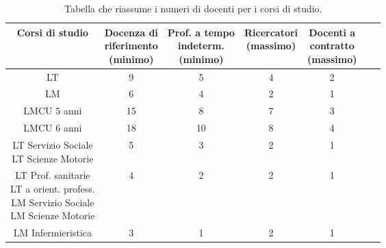\begin{table}[h!]
    \centering
    \renewcommand{\arraystretch}{1.8}
    \begin{tabular}{|c|c|c|c|c|c|c|}
    \hline
    Corsi di studio & \makecell{Docenza di \\riferimento \\(\textbf{minimo})} & \makecell{Prof. a tempo\\indeterm.\\(\textbf{minimo})} & \makecell{Ricercatori\\(\textbf{massimo})} & \makecell{Docenti a\\contratto\\(\textbf{massimo})} \\
    \hline
    LT & 9 & 5 & 4 & 2 \\
    \hline 
    LM & 6 & 4 & 2 & 1 \\
    \hline
    LMCU 5 anni & 15 & 8 & 7 & 3 \\
    \hline
    LMCU 6 anni & 18 & 10 & 8 & 4 \\
    \hline
    \makecell{LT Servizio Sociale\\LT Scienze Motorie} & 5 & 3 & 2 & 1 \\
    \hline
    \makecell{LT Prof. sanitarie\\LT a orient. profess.\\LM Servizio Sociale\\LM Scienze Motorie} & 4 & 2 & 2 & 1 \\
    \hline
    LM Infermieristica & 3 & 1 & 2 & 1 \\
    \hline
    \end{tabular}
    \caption{Tabella che riassume i numeri di docenti per i corsi di studio.}
    \label{tab:casi-particolari}
\end{table}

